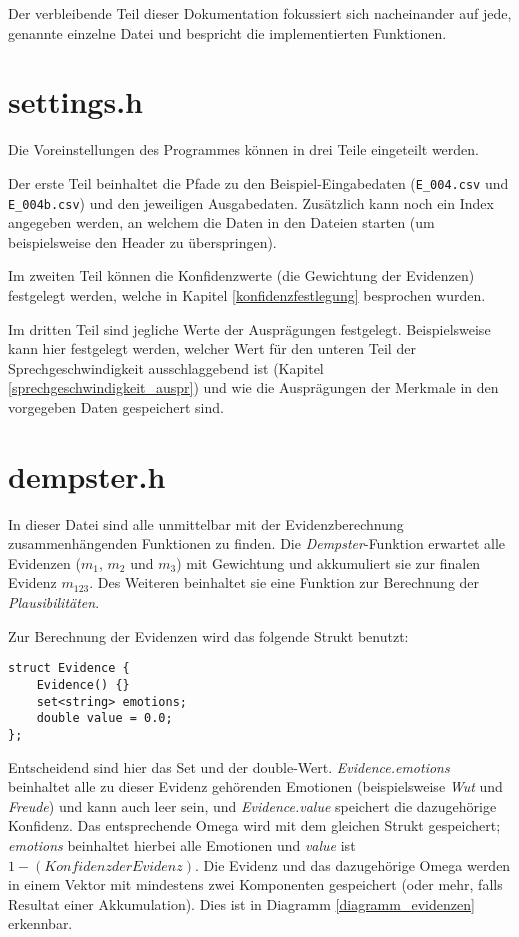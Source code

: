  Der verbleibende Teil dieser Dokumentation fokussiert sich nacheinander auf jede, genannte einzelne Datei und bespricht die implementierten Funktionen.

\section{settings.h}
Die Voreinstellungen des Programmes können in drei Teile eingeteilt werden.

Der erste Teil beinhaltet die Pfade zu den Beispiel-Eingabedaten (\verb|E_004.csv| und \verb|E_004b.csv|) und den jeweiligen Ausgabedaten. Zusätzlich kann noch ein Index angegeben werden, an welchem die Daten in den Dateien starten (um beispielsweise den Header zu überspringen).

Im zweiten Teil können die Konfidenzwerte (die Gewichtung der Evidenzen) festgelegt werden, welche in Kapitel \ref{konfidenzfestlegung} besprochen wurden. 

Im dritten Teil sind jegliche Werte der Ausprägungen festgelegt. Beispielsweise kann hier festgelegt werden, welcher Wert für den unteren Teil der Sprechgeschwindigkeit ausschlaggebend ist (Kapitel \ref{sprechgeschwindigkeit_auspr}) und wie die Ausprägungen der Merkmale in den vorgegeben Daten gespeichert sind.

\section{dempster.h}
In dieser Datei sind alle unmittelbar mit der Evidenzberechnung zusammenhängenden Funktionen zu finden. Die \textit{Dempster}-Funktion erwartet alle Evidenzen (\(m_1\), \(m_2\) und \(m_3\)) mit Gewichtung und akkumuliert sie zur finalen Evidenz \(m_{123}\). Des Weiteren beinhaltet sie eine Funktion zur Berechnung der \textit{Plausibilitäten}.

Zur Berechnung der Evidenzen wird das folgende Strukt benutzt:

\begin{lstlisting}[caption=Strukt zur Evidenzberechnung, label=structcode]
struct Evidence {
	Evidence() {}
	set<string> emotions;
	double value = 0.0;
};
\end{lstlisting}


Entscheidend sind hier das Set und der double-Wert. \textit{Evidence.emotions} beinhaltet alle zu dieser Evidenz gehörenden Emotionen (beispielsweise \textit{Wut} und \textit{Freude}) und kann auch leer sein, und \textit{Evidence.value} speichert die dazugehörige Konfidenz. Das entsprechende Omega wird mit dem gleichen Strukt gespeichert; \textit{emotions} beinhaltet hierbei alle Emotionen und \textit{value} ist \(1 - (Konfidenz der Evidenz)\). Die Evidenz und das dazugehörige Omega werden in einem Vektor mit mindestens zwei Komponenten gespeichert (oder mehr, falls Resultat einer Akkumulation). Dies ist in Diagramm \ref{diagramm_evidenzen} erkennbar.

